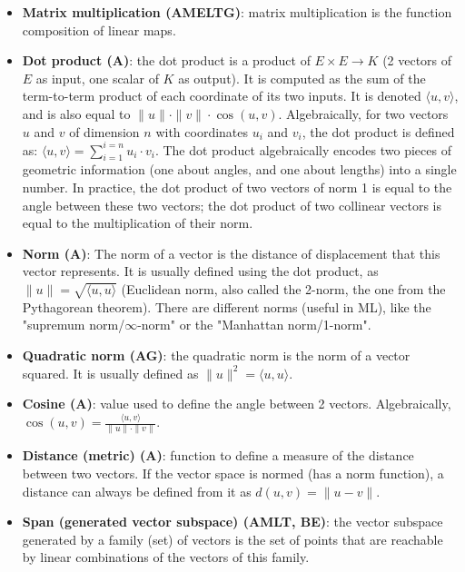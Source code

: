 \documentclass{article}
\begin{document}
\begin{itemize}
	\item \textbf{Matrix multiplication (AMELTG)}: matrix multiplication is the function composition of linear maps.

	\item \textbf{Dot product (A)}: the dot product is a product of $E \times E \rightarrow K$ (2 vectors of $E$ as input, one scalar of $K$ as output). It is computed as the sum of the term-to-term product of each coordinate of its two inputs. It is denoted $\langle u, v \rangle$, and is also equal to $\|u\| \cdot \|v\| \cdot \cos(u,v)$. Algebraically, for two vectors $u$ and $v$ of dimension $n$ with coordinates $u_i$ and $v_i$, the dot product is defined as: $\langle u, v \rangle = \sum_{i=1}^{i=n} u_i \cdot v_i$. The dot product algebraically encodes two pieces of geometric information (one about angles, and one about lengths) into a single number. In practice, the dot product of two vectors of norm 1 is equal to the angle between these two vectors; the dot product of two collinear vectors is equal to the multiplication of their norm.

	\item \textbf{Norm (A)}: The norm of a vector is the distance of displacement that this vector represents. It is usually defined using the dot product, as $\|u\| = \sqrt{\langle u, u \rangle}$ (Euclidean norm, also called the 2-norm, the one from the Pythagorean theorem). There are different norms (useful in ML), like the "supremum norm/$\infty$-norm" or the "Manhattan norm/1-norm".

	\item \textbf{Quadratic norm (AG)}: the quadratic norm is the norm of a vector squared. It is usually defined as $\|u\|^2 = \langle u, u \rangle$.

	\item \textbf{Cosine (A)}: value used to define the angle between 2 vectors. Algebraically, $\cos(u, v) = \frac{\langle u, v \rangle}{\|u\| \cdot \|v\|}$.

	\item \textbf{Distance (metric) (A)}: function to define a measure of the distance between two vectors. If the vector space is normed (has a norm function), a distance can always be defined from it as $d(u, v) = \|u - v\|$.

	\item \textbf{Span (generated vector subspace) (AMLT, BE)}: the vector subspace generated by a family (set) of vectors is the set of points that are reachable by linear combinations of the vectors of this family.


\end{itemize}
\end{document}
